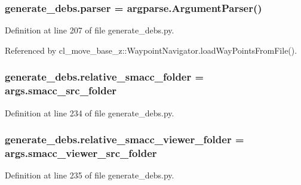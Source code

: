 \subsubsection[{\texorpdfstring{parser}{parser}}]{\setlength{\rightskip}{0pt plus 5cm}generate\+\_\+debs.\+parser = argparse.\+Argument\+Parser()}\hypertarget{namespacegenerate__debs_a4a9ae4bb85fc62d7973ea3d09ced6c26}{}\label{namespacegenerate__debs_a4a9ae4bb85fc62d7973ea3d09ced6c26}


Definition at line 207 of file generate\+\_\+debs.\+py.



Referenced by cl\+\_\+move\+\_\+base\+\_\+z\+::\+Waypoint\+Navigator.\+load\+Way\+Points\+From\+File().

\subsubsection[{\texorpdfstring{relative\+\_\+smacc\+\_\+folder}{relative_smacc_folder}}]{\setlength{\rightskip}{0pt plus 5cm}generate\+\_\+debs.\+relative\+\_\+smacc\+\_\+folder = args.\+smacc\+\_\+src\+\_\+folder}\hypertarget{namespacegenerate__debs_abf6925bd06ac1da3981fe638eefb5a61}{}\label{namespacegenerate__debs_abf6925bd06ac1da3981fe638eefb5a61}


Definition at line 234 of file generate\+\_\+debs.\+py.

\subsubsection[{\texorpdfstring{relative\+\_\+smacc\+\_\+viewer\+\_\+folder}{relative_smacc_viewer_folder}}]{\setlength{\rightskip}{0pt plus 5cm}generate\+\_\+debs.\+relative\+\_\+smacc\+\_\+viewer\+\_\+folder = args.\+smacc\+\_\+viewer\+\_\+src\+\_\+folder}\hypertarget{namespacegenerate__debs_a22d892b78adfce583710d78737eb4747}{}\label{namespacegenerate__debs_a22d892b78adfce583710d78737eb4747}


Definition at line 235 of file generate\+\_\+debs.\+py.

